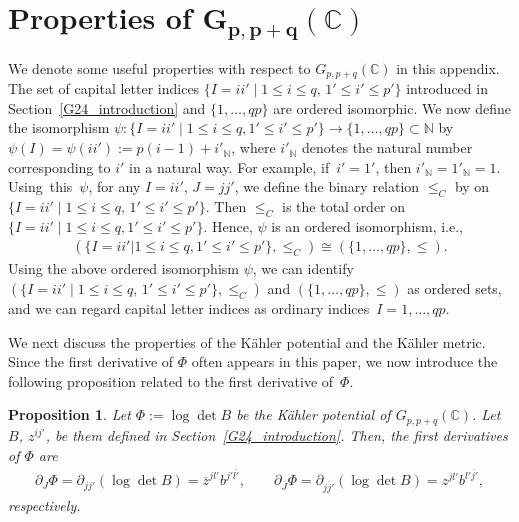 \documentclass[pdftex]{sigma}
\numberwithin{equation}{section}
\newtheorem{Proposition}[Theorem]{Proposition}
 { \theoremstyle{definition}
\newtheorem{Definition}[Theorem]{Definition}
\newtheorem{Note}[Theorem]{Note}
\newtheorem{Example}[Theorem]{Example}
\newtheorem{Remark}[Theorem]{Remark} }
\begin{document}
\section[Properties of G\_\{p,p+q\}(C)]{Properties of $\boldsymbol{G_{p,p+q}(\mathbb{C})}$}
\label{appendix_properties_Gpq}

We denote some useful properties with respect to $G_{p,p+q}(\mathbb{C})$ in this appendix. The set of capital letter indices $\{I=ii'\mid 1\leq i\leq q,\, 1'\leq i'\leq p' \}$ introduced in Section~\ref{G24_introduction} and
$\{1,\dots,qp\}$
are ordered isomorphic. We now define the isomorphism
$ \psi\colon \{ I=ii' \mid {1 \leq i \leq q},\allowbreak 1' \leq i' \leq p'\} \to\{ 1,\dots,qp\} \subset \mathbb{N}$
by
$
 \psi
( I)
 =
 \psi
 (
 ii'
 )
 :=
 p
(
 i-1
)
 +
 {i'}_{\mathbb{N}}$,
where ${i'}_{\mathbb{N}}$ denotes the natural number corresponding to $i'$ in a natural way. For example, if~${i'=1'}$, then ${i'}_{\mathbb{N}}={1'}_{\mathbb{N}}=1$.
Using~this~$\psi$, for any
$
 I
 =
 ii'$,
$
 J=jj'
$,
we define the binary relation $\leq_{C}$ by
on~${
 \{
 I=ii'
 \mid
 1
 \leq
 i
 \leq
 q,\,
 1'
 \leq
 i'
 \leq
 p'
 \}}
$.
Then $\leq_{C}$ is the total order
on $\{I=ii'\mid 1\leq i\leq q,\allowbreak {1'\leq i'\leq p'}\}$. Hence, $\psi$ is an ordered isomorphism, i.e.,
\begin{align*}
 (
 \{
 I=ii'
 |
 1
 \leq
 i
 \leq
 q,
 1'
 \leq
 i'
 \leq
 p'
 \},
 \leq_{C}
 )
 \cong
 (
 \{
 1,\dots,qp
 \},
 \leq
 ).
\end{align*}
Using the above ordered isomorphism $\psi$, we can identify
$
 (
 \{
 I=ii'
\mid
 1
 \leq
 i
 \leq
 q,\,
 1'
 \leq
 i'
 \leq
 p'
 \},\allowbreak
 \leq_{C}
 )
$
and
$
 (
 \{
 1,\dots,qp
 \},
 \leq
 )
$
as ordered sets, and we can regard capital letter indices as ordinary indices~${I=1,\dots,qp}$.

We next discuss the properties of
the K\"ahler potential and the K\"ahler metric.
Since the first derivative of $\Phi$ often appears in this paper, we now introduce the following proposition related to the first derivative of~$\Phi$.

\begin{Proposition}\label{prop_first_deriv_potential}
Let
$
\Phi
:=
\log
\det
B
$
be the K\"ahler potential of $G_{p,p+q}(\mathbb{C})$. Let
$
B$, $
z^{ij'}$,
be them defined in Section~{\rm\ref{G24_introduction}}. Then, the first derivatives of $\Phi$ are
\begin{align}
 \partial_{J}
 \Phi
 =
 \partial_{jj'}
 (
 \log
 \det
 B
 )
 =
 \overline{z}^{jl'}
 b^{j'\overline{l'}},
 \qquad
 \partial_{\overline{J}}
 \Phi
 =
 \partial_{\overline{jj'}}
 (
 \log
 \det
 B
 )
 =
 z^{jl'}
 b^{l'\overline{j'}},
 \label{partial_1st}
\end{align}
respectively.
\end{Proposition}
\end{document}
